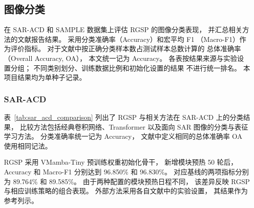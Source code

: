 \documentclass[journal]{IEEEtran}
\begin{document}
\subsection{图像分类}
\label{sec:classification_results}

在 SAR-ACD 和 SAMPLE 数据集上评估 RGSP 的图像分类表现，
并汇总相关方法的文献报告结果。
采用分类准确率（Accuracy）和宏平均 F1
（Macro-F1）作为评价指标。
对于文献中按正确分类样本数占测试样本总数计算的
总体准确率（Overall Accuracy, OA），
本文统一记为 Accuracy。
各表按结果来源与实验设置分组；
不同类别划分、训练数据比例和初始化设置的结果
不进行统一排名。
本项目结果均为单种子记录。

\subsubsection{SAR-ACD}
\label{sec:sar_acd_results}

表~\ref{tab:sar_acd_comparison}
列出了 RGSP 与相关方法在 SAR-ACD 上的分类结果，
比较方法包括经典卷积网络、Transformer
以及面向 SAR 图像的分类与表征学习方法。
分类准确率统一记为 Accuracy，
文献中定义相同的总体准确率 OA 使用相同记法。

RGSP 采用 VMamba-Tiny 预训练权重初始化骨干，
新增模块预热 50 轮后，
Accuracy 和 Macro-F1 分别达到
96.850\% 和 96.830\%。
对应基线的两项指标分别为
89.764\% 和 89.585\%。
由于两种配置的模块预热日程不同，
该差异反映 RGSP 与相应训练策略的组合表现。
外部方法采用各自文献中的实验设置，
其结果作为参考列示。
\end{document}
